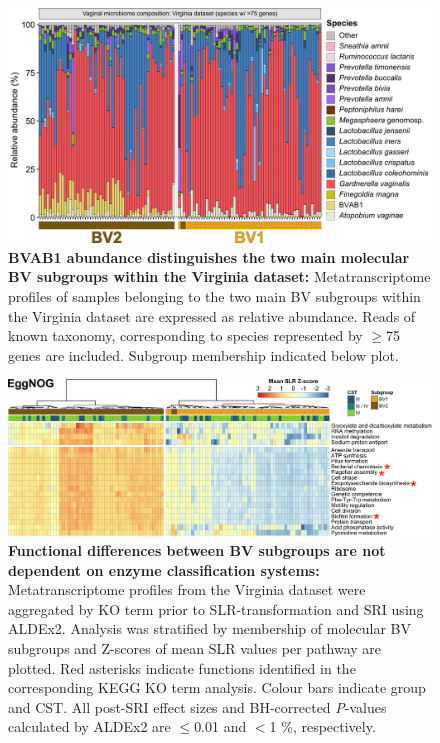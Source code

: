 \documentclass[sn-mathphys,Numbered]{sn-jnl}%
\begin{document}
\begin{figure}[H]
    \centering
    \includegraphics[scale = 0.875]{0_supplFig8.png}
    \caption{\textbf{BVAB1 abundance distinguishes the two main molecular BV subgroups within the Virginia dataset:} Metatranscriptome profiles of samples belonging to the two main BV subgroups within the Virginia dataset are expressed as relative abundance. Reads of known taxonomy, corresponding to species represented by $\geq$75 genes are included. Subgroup membership indicated below plot.} \label{fig:sfigVirgBVstackedBars}
\end{figure}
\newpage

\begin{figure}[H]
    \centering
    \includegraphics[scale = 0.81]{0_supplFig9.png}
    \caption{\textbf{Functional differences between BV subgroups are not dependent on enzyme classification systems:} Metatranscriptome profiles from the Virginia dataset were aggregated by KO term prior to SLR-transformation and SRI using ALDEx2. Analysis was stratified by membership of molecular BV subgroups and Z-scores of mean SLR values per pathway are plotted. Red asterisks indicate functions identified in the corresponding KEGG KO term analysis. Colour bars indicate group and CST. All post-SRI effect sizes and BH-corrected \textit{P}-values calculated by ALDEx2 are $\leq$0.01 and $<$1 \%, respectively.} \label{fig:sfigEggNOGvirginia}
\end{figure}
\newpage
\end{document}
